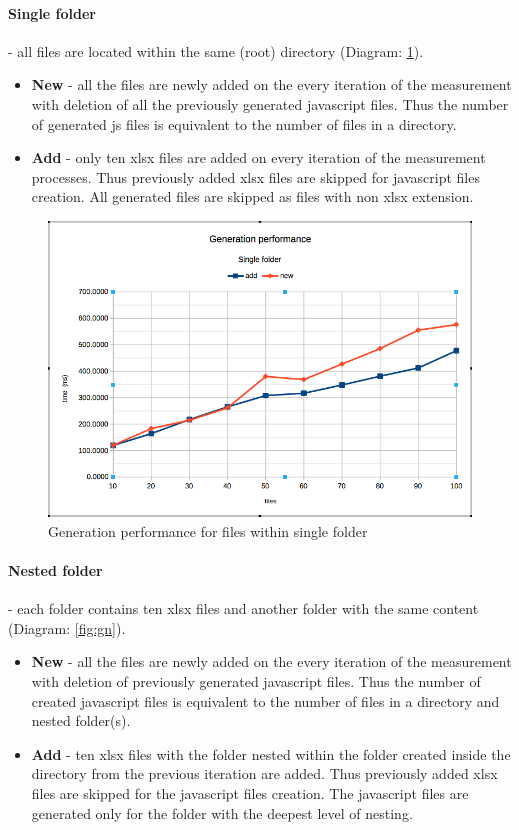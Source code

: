 \paragraph{Single folder} - all files are located within the same (root) directory (Diagram: \ref{fig:gs}).
\begin{itemize}
	\item \textbf{New} - all the files are newly added on the every iteration of the measurement with deletion of all the previously generated javascript files. Thus the number of generated js files is equivalent to the number of files in a directory.
	\item \textbf{Add} - only ten xlsx files are added on every iteration of the measurement processes. Thus previously added xlsx files are skipped for javascript files creation. All generated files are skipped as files with non xlsx extension.
\end{itemize}


\begin{figure}[ht]
	\label{fig:gs}
	\centering
	\includegraphics[width=\textwidth]{grafiken/generation_single}
	\caption{Generation performance for files within single folder}
\end{figure}

\paragraph{Nested folder} - each folder contains ten xlsx files and another folder with the same content (Diagram: \ref{fig:gn}).
\begin{itemize}
	\item \textbf{New} - all the files are newly added on the every iteration of the measurement with deletion of previously generated javascript files. Thus the number of created javascript files is equivalent to the number of files in a directory and nested folder(s).
	\item \textbf{Add} - ten xlsx files with the folder nested within the folder created inside the directory from the previous iteration are added. Thus previously added xlsx files are skipped for  the javascript files creation. The javascript files are generated only for the folder with the deepest level of nesting.
\end{itemize}


